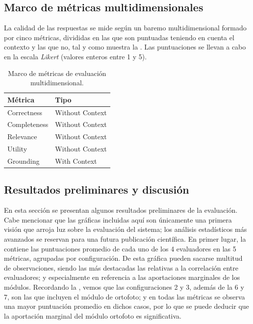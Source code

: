 \subsection{Marco de métricas multidimensionales}

La calidad de las respuestas se mide según un baremo multidimensional formado por cinco métricas, divididas en las que son puntuadas teniendo en cuenta el contexto y las que no, tal y como muestra la . Las puntuaciones se llevan a cabo en la escala \textit{Likert} (valores enteros entre 1 y 5). 

\begin{table}[H]
    \caption{Marco de métricas de evaluación multidimensional.}
    \label{tab:evaluation_metrics}
    \begin{tabular}{
        >{\raggedright\arraybackslash}p{}
        >{\raggedleft\arraybackslash}p{}
    }
    \toprule
    \textbf{Métrica} & \textbf{Tipo} \\
    \midrule
    Correctness & Without Context \\
    Completeness & Without Context \\
    Relevance & Without Context \\
    Utility & Without Context \\
    \midrule
    Grounding & With Context \\
    \bottomrule
    \end{tabular}
\end{table}

\subsection{Resultados preliminares y discusión}

En esta sección se presentan algunos resultados preliminares de la evaluación. Cabe mencionar que las gráficas incluidas aquí son únicamente una primera visión que arroja luz sobre la evaluación del sistema; los análisis estadísticos más avanzados se reservan para una futura publicación científica. En primer lugar, la  contiene las puntuaciones promedio de cada uno de los 4 evaluadores en las 5 métricas, agrupadas por configuración. De esta gráfica pueden sacarse multitud de observaciones, siendo las más destacadas las relativas a la correlación entre evaluadores; y especialmente en referencia a las aportaciones marginales de los módulos. Recordando la , vemos que las configuraciones 2 y 3, además de la 6 y 7, son las que incluyen el módulo de ortofoto; y en todas las métricas se observa una mayor puntuación promedio en dichos casos, por lo que se puede deducir que la aportación marginal del módulo ortofoto es significativa. 

